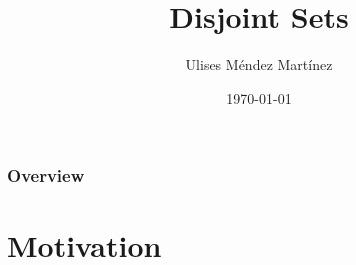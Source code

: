 \documentclass{beamer}
\title[Disjoint Sets]{Disjoint Sets} %
\author{Ulises M\'endez Mart\'{i}nez} %
\institute[UTM] %
{
Algorist Weekly Talks \\ %
\medskip
\textit{ulisesmdzmtz@gmail.com} %
}
\date{\today} %
\begin{document}
\begin{frame}
\titlepage %
\end{frame}


\begin{frame}
\frametitle{Overview} %
\tableofcontents %
\end{frame}


\section{Motivation} 
\end{document}
